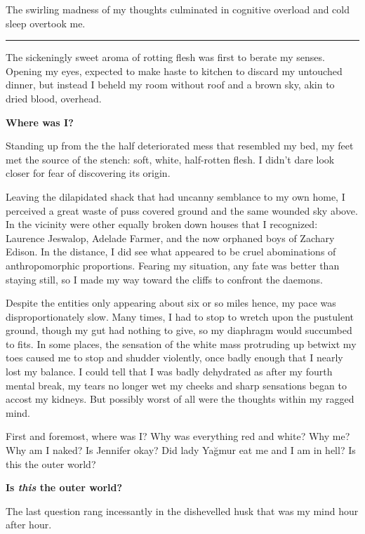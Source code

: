The swirling madness of my thoughts culminated in cognitive overload and cold sleep overtook me.

\noindent\rule{\textwidth}{1pt}

The sickeningly sweet aroma of rotting flesh was first to berate my senses. Opening my eyes,
expected to make haste to kitchen to discard my untouched dinner, but instead I beheld my room
without roof and a brown sky, akin to dried blood, overhead.

\vspace{5mm}
\textbf{Where was I?}
\vspace{5mm}

Standing up from the the half deteriorated mess that resembled my bed, my feet met the source of the
stench: soft, white, half-rotten flesh. I didn't dare look closer for fear of discovering its
origin.

Leaving the dilapidated shack that had uncanny semblance to my own home, I perceived a great waste
of puss covered ground and the same wounded sky above. In the vicinity were other equally broken
down houses that I recognized: Laurence Jeswalop, Adelade Farmer, and the now orphaned boys of
Zachary Edison. In the distance, I did see what appeared to be cruel abominations of anthropomorphic
proportions. Fearing my situation, any fate was better than staying still, so I made my way toward
the cliffs to confront the daemons.

Despite the entities only appearing about six or so miles hence, my pace was disproportionately
slow. Many times, I had to stop to wretch upon the pustulent ground, though my gut had nothing to
give, so my diaphragm would succumbed to fits. In some places, the sensation of the white mass
protruding up betwixt my toes caused me to stop and shudder violently, once badly enough that I
nearly lost my balance. I could tell that I was badly dehydrated as after my fourth mental break, my
tears no longer wet my cheeks and sharp sensations began to accost my kidneys. But possibly worst of
all were the thoughts within my ragged mind.

First and foremost, where was I? Why was everything red and white? Why me? Why am I naked? Is
Jennifer okay? Did lady Yağmur eat me and I am in hell? Is this the outer world?

\vspace{5mm}
\textbf{Is \textit{this} the outer world?}
\vspace{5mm}

The last question rang incessantly in the dishevelled husk that was my mind hour after hour.


